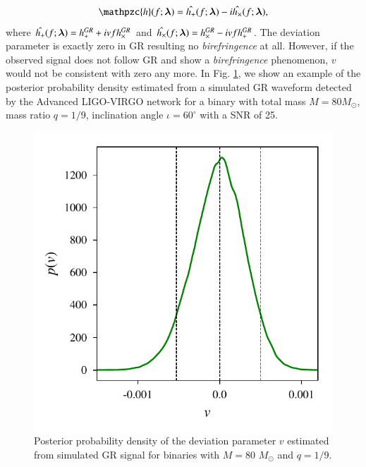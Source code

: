 \documentclass[prd,preprintnumbers,twocolumn,eqsecnum,floatfix,a4paper,nofootinbib,superscriptaddress]{revtex4}
\newcommand{\h}{\mathpzc{h}}
\newcommand{\blambda}{\bm{\lambda}}
\begin{document}
\begin{eqnarray} 
\h(f; \blambda) =  \Hat{h_+}(f; \blambda) - i \Hat{h_\times}(f; \blambda),
\label{eq:test_cs}
\end{eqnarray}
where $\Hat{h_+}(f; \blambda)=h^{GR}_+ + i v f h^{GR}_{\times}$ and $\Hat{h_\times}(f; \blambda)=h^{GR}_\times - i v f h^{GR}_{+}$. The deviation parameter is exactly zero in GR resulting no \textit{birefringence} at all. However, if the observed signal does not follow GR and show a \textit{birefringence} phenomenon, $v$ would not be consistent with zero any more. In Fig. \ref{fig:cs_hist}, we show an example of the posterior probability density estimated from a simulated GR waveform detected by the Advanced LIGO-VIRGO network for a binary with total mass $M = 80M_{\odot}$, mass ratio $q=1/9$, inclination angle $ {\iota}=60^{\circ} $ with a SNR of 25. 

\begin{figure}[htb]
	\begin{center}
		\includegraphics[scale=0.7]{figs/v1_GR_hist_M_80_q_9_dL_250.pdf} 
	\end{center} 
	\caption{Posterior probability density of the deviation parameter $v$ estimated from simulated GR signal for binaries with $M=80$ $M_{\odot}$ and $q=1/9$. }
	\label{fig:cs_hist}
\end{figure}
\end{document}
